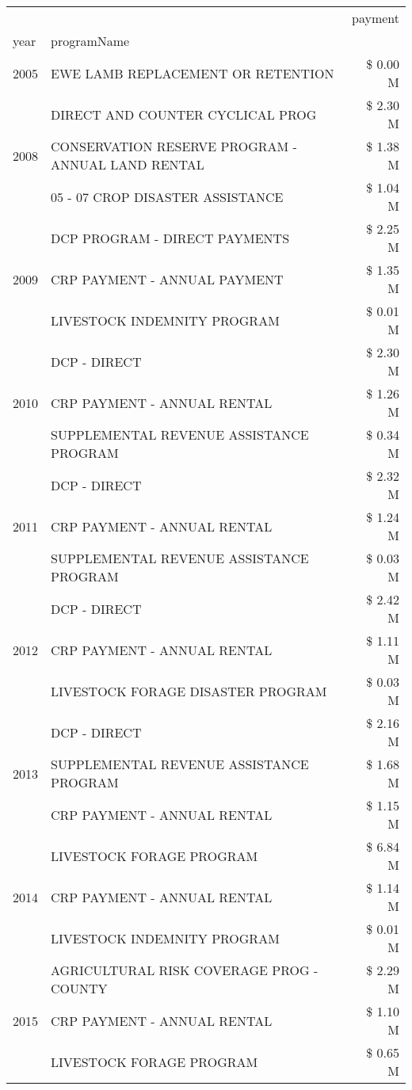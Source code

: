 \begin{tabular}{llr}
\toprule
 &  & payment \\
year & programName &  \\
\midrule
2005 & EWE LAMB REPLACEMENT OR RETENTION & \$ 0.00 M \\
\cline{1-3}
\multirow[t]{3}{*}{2008} & DIRECT AND COUNTER CYCLICAL PROG & \$ 2.30 M \\
 & CONSERVATION RESERVE PROGRAM - ANNUAL LAND RENTAL & \$ 1.38 M \\
 & 05 - 07 CROP DISASTER ASSISTANCE & \$ 1.04 M \\
\cline{1-3}
\multirow[t]{3}{*}{2009} & DCP PROGRAM - DIRECT PAYMENTS & \$ 2.25 M \\
 & CRP PAYMENT - ANNUAL PAYMENT & \$ 1.35 M \\
 & LIVESTOCK INDEMNITY PROGRAM & \$ 0.01 M \\
\cline{1-3}
\multirow[t]{3}{*}{2010} & DCP - DIRECT & \$ 2.30 M \\
 & CRP PAYMENT - ANNUAL RENTAL & \$ 1.26 M \\
 & SUPPLEMENTAL REVENUE ASSISTANCE PROGRAM & \$ 0.34 M \\
\cline{1-3}
\multirow[t]{3}{*}{2011} & DCP - DIRECT & \$ 2.32 M \\
 & CRP PAYMENT - ANNUAL RENTAL & \$ 1.24 M \\
 & SUPPLEMENTAL REVENUE ASSISTANCE PROGRAM & \$ 0.03 M \\
\cline{1-3}
\multirow[t]{3}{*}{2012} & DCP - DIRECT & \$ 2.42 M \\
 & CRP PAYMENT - ANNUAL RENTAL & \$ 1.11 M \\
 & LIVESTOCK FORAGE DISASTER PROGRAM & \$ 0.03 M \\
\cline{1-3}
\multirow[t]{3}{*}{2013} & DCP - DIRECT & \$ 2.16 M \\
 & SUPPLEMENTAL REVENUE ASSISTANCE PROGRAM & \$ 1.68 M \\
 & CRP PAYMENT - ANNUAL RENTAL & \$ 1.15 M \\
\cline{1-3}
\multirow[t]{3}{*}{2014} & LIVESTOCK FORAGE PROGRAM & \$ 6.84 M \\
 & CRP PAYMENT - ANNUAL RENTAL & \$ 1.14 M \\
 & LIVESTOCK INDEMNITY PROGRAM & \$ 0.01 M \\
\cline{1-3}
\multirow[t]{3}{*}{2015} & AGRICULTURAL RISK COVERAGE PROG - COUNTY & \$ 2.29 M \\
 & CRP PAYMENT - ANNUAL RENTAL & \$ 1.10 M \\
 & LIVESTOCK FORAGE PROGRAM & \$ 0.65 M \\

\end{tabular}
